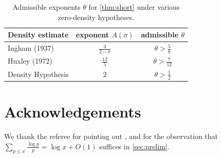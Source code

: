 \documentclass[11pt]{amsart}
\numberwithin{equation}{section}
\theoremstyle{plain}
\theoremstyle{definition}
\theoremstyle{remark}
\begin{document}
\begin{table}[ht]
\centering
\caption{Admissible exponents $\theta$ for \cref{thm:short} under various zero-density hypotheses.}
\label{tab:theta}
\begin{tabular}{lcc}
\hline
Density estimate & exponent $A(\sigma)$ & admissible $\theta$ \\
\hline
Ingham (1937) & $\frac{3}{2-\sigma}$ & $\theta>\frac58$ \\
Huxley (1972) & $\frac{12}{5}$ & $\theta>\frac{7}{12}$ \\
Density Hypothesis & $2$ & $\theta>\frac12$ \\
\hline
\end{tabular}
\end{table}

\section*{Acknowledgements}
We thank the referee for pointing out \cite{Titchmarsh}, and for the observation that
$\sum_{p\le x}\frac{\log p}{p}=\log x+O(1)$ suffices in \cref{sec:prelim}.



\end{document}
